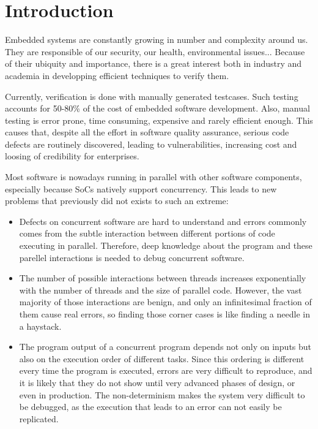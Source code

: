 \documentclass[conference]{IEEEtran}
\begin{document}
\section{Introduction}

Embedded systems are constantly growing in number and complexity around us. They are responsible of our security, our health, environmental issues... Because of their ubiquity and importance, there is a great interest both in industry and academia in developping efficient techniques to verify them.

Currently, verification is done with manually generated testcases. Such testing accounts for 50-­80\% of the cost of embedded software development. Also, manual testing is error ­prone, time ­consuming, expensive and rarely efficient enough. This causes that, despite all the effort in software quality assurance, serious code defects are routinely discovered, leading to vulnerabilities, increasing cost and loosing of credibility for enterprises.

Most software is nowadays running in parallel with other software components, especially because SoCs natively support concurrency. This leads to new problems that previously did not exists to such an extreme:

\begin{itemize}
    \item Defects on concurrent software are hard to understand and errors commonly comes from the subtle interaction between different portions of code executing in parallel. Therefore, deep knowledge about the program and these parellel interactions is needed to debug concurrent software.
    \item The number of possible interactions between threads increases exponentially with the number of threads and the size of parallel code. However, the vast majority of those interactions are benign, and only an infinitesimal fraction of them cause real errors, so finding those corner cases is like finding a needle in a haystack.
    \item The program output of a concurrent program depends not only on inputs but also on the execution order of different tasks. Since this ordering is different every time the program is executed, errors are very difficult to reproduce, and it is likely that they do not show until very advanced phases of design, or even in production. The non-­determinism makes the system very difficult to be debugged, as the execution that leads to an error can not easily be replicated.
\end{itemize}
\end{document}
